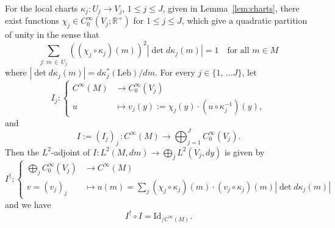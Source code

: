 \documentclass[AHL,Unicode,longabstracts,published]{cedram}
\newcommand{\Lebb}{\mathrm{Leb}}
\newcommand{\Id}{\mathrm{Id}}
\newcommand{\bbR}{\mathbb{R}}
\newcommand{\bbR}{\mathbb{R}}
\begin{document}
\begin{lemm}\label{lem:I-I*}
For the local charts $\kappa_{j}:U_{j}\to V_{j}$, $1\le j\le J$, given in Lemma~\ref{lem:charts}, there exist functions $\chi_{j}\in C_{0}^{\infty}(V_{j};\bbR^{+})$ for $1\le j\le J$, which give a quadratic partition of unity in the sense that
\begin{equation}\label{eq:partition_quadratic_unity-1}
\sum_{j:\,m\,\in\,U_{j}}\left(\left(\chi_{j}\circ\kappa_{j}\right)\left(m\right)\right)^{2}\left|\det d\kappa_{j}\left(m\right)\right|=1\quad\text{for all }m\in M
\end{equation}
where $|\det d\kappa_{j}(m)|=d\kappa_{j}^{*}(\Lebb)/dm$. For every $j\in\{ 1,\,\ldots J\} $, let
\begin{equation}\label{eq:def_I-2}
I_{j}:
\begin{cases}
C^{\infty}\left(M\right) & \rightarrow C_{0}^{\infty}\left(V_{j}\right)\\
u & \mapsto v_{j}\left(y\right):=\chi_{j}\left(y\right)\cdot\left(u\circ\kappa_{j}^{-1}\right)\left(y\right),
\end{cases}
\end{equation}
and
\begin{equation}\label{eq:def_I_1}
I:=\left(I_{j}\right)_{j}\,:C^{\infty}\left(M\right)\rightarrow\bigoplus_{j=1}^{J}C_{0}^{\infty}\left(V_{j}\right).
\end{equation}
Then the $L^{2}$-adjoint of $I:L^{2}(M,dm)\rightarrow\bigoplus_{j}L^{2}(V_{j},dy)$ is given by
\begin{equation}\label{eq:def_I*-2}
I^{\dagger}:
\begin{cases}
\bigoplus_{j}C_{0}^{\infty}\left(V_{j}\right) & \rightarrow C^{\infty}\left(M\right)\\
v=\left(v_{j}\right)_{j} & \mapsto u\left(m\right)=\sum_{j}\left(\chi_{j}\circ\kappa_{j}\right)\left(m\right)\cdot\left(v_{j}\circ\kappa_{j}\right)\left(m\right)\left|\det d\kappa_{j}\left(m\right)\right|
\end{cases}
\end{equation}
and we have
\begin{equation}\label{eq:I*_I}
I^{\dagger}\circ I=\Id _{/C^{\infty}\left(M\right)}.
\end{equation}
\end{lemm}
\end{document}
